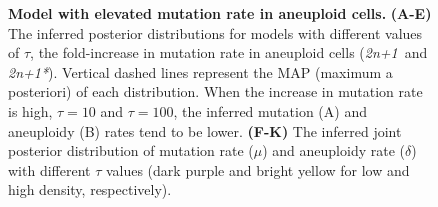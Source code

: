 \documentclass[12pt]{extarticle}
\newcommand{\anwt}{\emph{2n+1}}
\newcommand{\anmt}{\emph{2n+1*}}
\begin{document}
\begin{figure}[h!]
\begin{subfigure}{0.325\textwidth}
  \end{subfigure}
  \caption{
    \textbf{Model with elevated mutation rate in aneuploid cells.}  \textbf{(A-E)} The inferred posterior distributions for models with different values of $\tau$, the fold-increase in mutation rate in aneuploid cells (\anwt\ and \anmt). Vertical dashed lines represent the MAP (maximum a posteriori) of each distribution. When the increase in mutation rate is high, $\tau=10$ and $\tau=100$, the inferred mutation (A) and aneuploidy (B) rates tend to be lower. 
    \textbf{(F-K)} The inferred joint posterior distribution of mutation rate ($\mu$) and aneuploidy rate ($\delta$) with different $\tau$ values (dark purple and bright yellow for low and high density, respectively).
  \label{fig:tau}
  }
  \end{figure}
  
\end{document}
